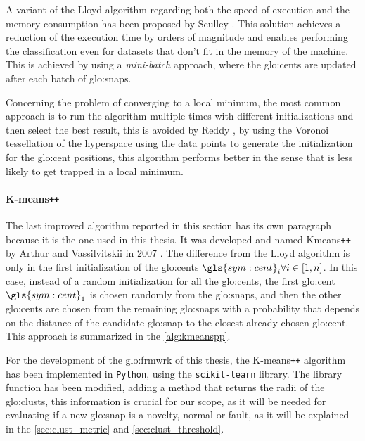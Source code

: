 A variant of the Lloyd algorithm regarding both the speed of execution and the memory consumption has been proposed by Sculley \cite{Sculley2010}. This solution achieves a reduction of the execution time by orders of magnitude and enables performing the classification even for datasets that don't fit in the memory of the machine. This is achieved by using a \emph{mini-batch} approach, where the {\gls{glo:cent}}s are updated after each batch of {\gls{glo:snap}}s.

Concerning the problem of converging to a local minimum, the most common approach is to run the algorithm multiple times with different initializations and then select the best result, this is avoided by Reddy \cite{Vornoi_Kmeans}, by using the Voronoi tessellation of the hyperspace using the data points to generate the initialization for the {\gls{glo:cent}} positions, this algorithm performs better in the sense that is less likely to get trapped in a local minimum.


\paragraph{K-means\texttt{++}} 
The last improved algorithm reported in this section has its own paragraph because it is the one used in this thesis. It was developed and named Kmeans\texttt{++} by Arthur and Vassilvitskii in 2007 \cite{Kmeanspp}. The difference from the Lloyd algorithm is only in the first initialization of the {\gls{glo:cent}}s $\gls{sym:cent}_i \forall i \in [1,n]$. In this case, instead of a random initialization for all the {\gls{glo:cent}}s, the first {\gls{glo:cent}} $\gls{sym:cent}_1$ is chosen randomly from the {\gls{glo:snap}}s, and then the other {\gls{glo:cent}}s are chosen from the remaining {\gls{glo:snap}}s with a probability that depends on the distance of the candidate {\gls{glo:snap}} to the closest already chosen {\gls{glo:cent}}. This approach is summarized in the \autoref{alg:kmeanspp}.

For the development of the \gls{glo:frmwrk} of this thesis, the K-means\texttt{++} algorithm has been implemented in \texttt{Python}, using the \texttt{scikit-learn} library. The library function has been modified, adding a method that returns the radii of the \gls{glo:clust}s, this information is crucial for our scope, as it will be needed for evaluating if a new {\gls{glo:snap}} is a novelty, normal or fault, as it will be explained in the \autoref{sec:clust_metric} and \autoref{sec:clust_threshold}.

